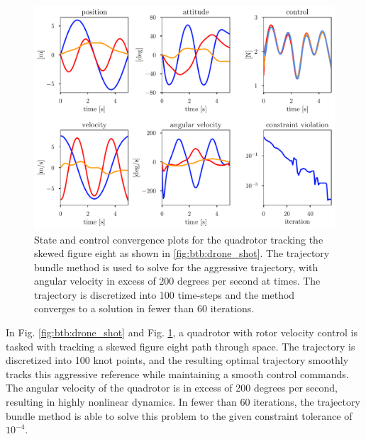 \begin{figure}
    \centering
    \includegraphics[width=0.9\linewidth]{bundles/examples/drone_fig.pdf}
    \caption{State and control convergence plots for the quadrotor tracking the skewed figure eight as shown in \ref{fig:btb:drone_shot}. The trajectory bundle method is used to solve for the aggressive trajectory, with angular velocity in excess of 200 degrees per second at times. The trajectory is discretized into 100 time-steps and the method converges to a solution in fewer than 60 iterations.}
    \label{fig:btb:drone}
\end{figure}


In Fig. \ref{fig:btb:drone_shot} and Fig. \ref{fig:btb:drone}, a quadrotor with rotor velocity control is tasked with tracking a skewed figure eight path through space. The trajectory is discretized into 100 knot points, and the resulting optimal trajectory smoothly tracks this aggressive reference while maintaining a smooth control commands. The angular velocity of the quadrotor is in excess of 200 degrees per second, resulting in highly nonlinear dynamics. In fewer than 60 iterations, the trajectory bundle method is able to solve this problem to the given constraint tolerance of $10^{-4}$. 


